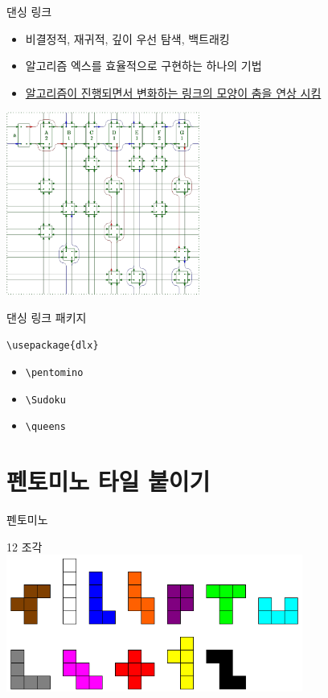 \documentclass[xcolor=svgnames]{beamer}
\begin{document}
%
\begin{frame}{댄싱 링크}
  \begin{itemize}
  \item 비결정적, 재귀적, 깊이 우선 탐색, 백트래킹
  \item 알고리즘 엑스를 효율적으로 구현하는 하나의 기법
  \item \href{https://www.youtube.com/watch?v=pN76VICZiKU&start=100}
    {알고리즘이 진행되면서 변화하는 링크의 모양이 춤을 연상 시킴}
  \end{itemize}
  \vspace{-3mm}
  \begin{center}
    \includegraphics[height=60mm]{imgs/cdance-4.png}
  \end{center}
\end{frame}

%
\begin{frame}[fragile]{댄싱 링크 패키지}
  \begin{center}
    \verb|\usepackage{dlx}|
  \end{center}
  
  \begin{itemize}
  \item \verb|\pentomino|
  \item \verb|\Sudoku|
  \item \verb|\queens|
  \end{itemize}
\end{frame}


\section{펜토미노 타일 붙이기}

%
\begin{frame}{펜토미노}
  \begin{center}
  {\Large 12 조각} \\
  \includegraphics[height=4.5cm]{imgs/pentominoes.png}
  \end{center}
\end{frame}
\end{document}
